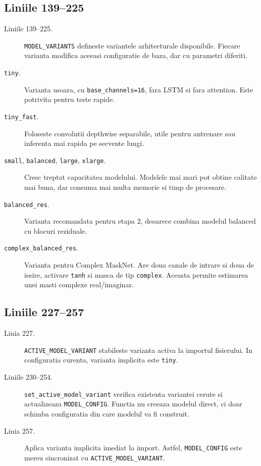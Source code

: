 \documentclass[12pt,a4paper]{report}
\newcommand{\codechunk}[2]{%
\subsection*{Liniile #1--#2}

}
\begin{document}
\codechunk{139}{225}

\begin{description}
    \item[Liniile 139--225.] \texttt{MODEL\_VARIANTS} defineste variantele arhitecturale
    disponibile. Fiecare varianta modifica aceeasi configuratie de baza, dar cu
    parametri diferiti.

    \item[\texttt{tiny}.] Varianta usoara, cu \texttt{base\_channels=16}, fara LSTM
    si fara attention. Este potrivita pentru teste rapide.

    \item[\texttt{tiny\_fast}.] Foloseste convolutii depthwise separabile, utile
    pentru antrenare sau inferenta mai rapida pe secvente lungi.

    \item[\texttt{small}, \texttt{balanced}, \texttt{large}, \texttt{xlarge}.]
    Cresc treptat capacitatea modelului. Modelele mai mari pot obtine calitate
    mai buna, dar consuma mai multa memorie si timp de procesare.

    \item[\texttt{balanced\_res}.] Varianta recomandata pentru etapa 2, deoarece
    combina modelul balanced cu blocuri reziduale.

    \item[\texttt{complex\_balanced\_res}.] Varianta pentru Complex MaskNet. Are
    doua canale de intrare si doua de iesire, activare \texttt{tanh} si masca de
    tip \texttt{complex}. Aceasta permite estimarea unei masti complexe real/imaginar.
\end{description}

\codechunk{227}{257}

\begin{description}
    \item[Linia 227.] \texttt{ACTIVE\_MODEL\_VARIANT} stabileste varianta activa la
    importul fisierului. In configuratia curenta, varianta implicita este
    \texttt{tiny}.

    \item[Liniile 230--254.] \texttt{set\_active\_model\_variant} verifica existenta
    variantei cerute si actualizeaza \texttt{MODEL\_CONFIG}. Functia nu creeaza
    modelul direct, ci doar schimba configuratia din care modelul va fi construit.

    \item[Linia 257.] Aplica varianta implicita imediat la import. Astfel,
    \texttt{MODEL\_CONFIG} este mereu sincronizat cu \texttt{ACTIVE\_MODEL\_VARIANT}.
\end{description}
\end{document}
